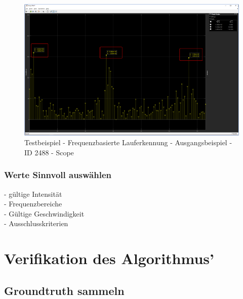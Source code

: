 \begin{figure}[H]
	\centering
	\includegraphics[width=\linewidth]{Bilder/Lauferkennung_Freqbasiert_Ausgangsbeispiel_ID2488_Scope.png}
	\caption{Testbeispiel - Frequenzbasierte Lauferkennung - Ausgangsbeispiel - ID 2488 - Scope}
	\label{fig:Lauferkennung_Freqbasiert_Ausgangsbeispiel_ID2488_Scope}
\end{figure}




\subsubsection{Werte Sinnvoll auswählen}
- gültige Intensität\\
- Frequenzbereiche\\
- Gültige Geschwindigkeit\\
- Ausschlusskriterien\\





\section{Verifikation des Algorithmus'}
%
%
%


\subsection{Groundtruth sammeln}

